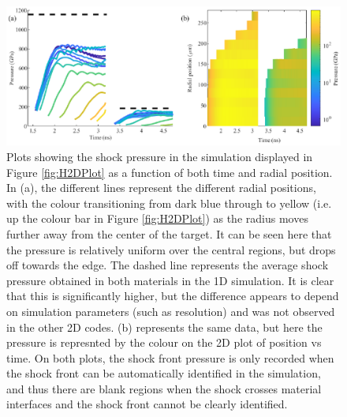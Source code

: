 \begin{figure}[hbt!]
\centering
\includegraphics[width=1\textwidth]{figures/Experiment/H2DPressure.eps}%
\caption{\label{fig:H2DPressure} Plots showing the shock pressure in the simulation displayed in Figure \ref{fig:H2DPlot} as a function of both time and radial position. In (a), the different lines represent the different radial positions, with the colour transitioning from dark blue through to yellow (i.e. up the colour bar in Figure \ref{fig:H2DPlot}) as the radius moves further away from the center of the target. It can be seen here that the pressure is relatively uniform over the central regions, but drops off towards the edge. The dashed line represents the average shock pressure obtained in both materials in the 1D simulation. It is clear that this is significantly higher, but the difference appears to depend on simulation parameters (such as resolution) and was not observed in the other 2D codes. (b) represents the same data, but here the pressure is represnted by the colour on the 2D plot of position vs time. On both plots, the shock front pressure is only recorded when the shock front can be automatically identified in the simulation, and thus there are blank regions when the shock crosses material interfaces and the shock front cannot be clearly identified.}
\end{figure}

